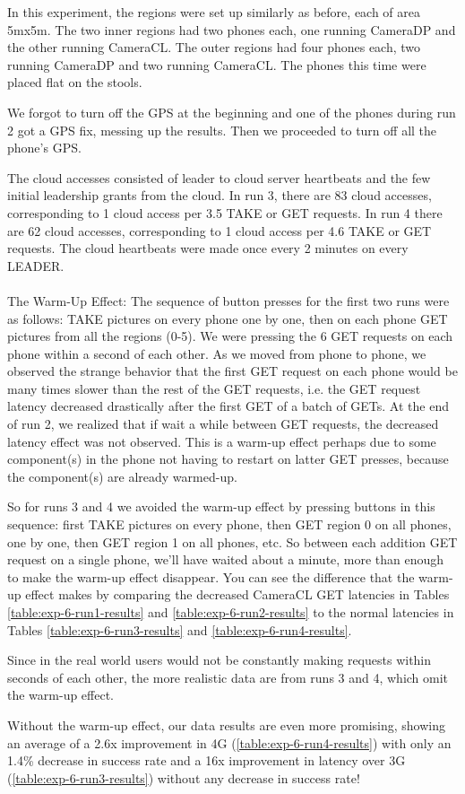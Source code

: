 In this experiment, the regions were set up similarly as before, each of area 5mx5m. The two inner regions had two phones each, one running CameraDP and the other running CameraCL. The outer regions had four phones each, two running CameraDP and two running CameraCL. The phones this time were placed flat on the stools.

We forgot to turn off the GPS at the beginning and one of the phones during run 2 got a GPS fix, messing up the results. Then we proceeded to turn off all the phone's GPS. 

The cloud accesses consisted of leader to cloud server heartbeats and the few initial leadership grants from the cloud. In run 3, there are 83 cloud accesses, corresponding to 1 cloud access per 3.5 TAKE or GET requests. In run 4 there are 62 cloud accesses, corresponding to 1 cloud access per 4.6 TAKE or GET requests. The cloud heartbeats were made once every 2 minutes on every LEADER.
\\
\\
The Warm-Up Effect:
The sequence of button presses for the first two runs were as follows: TAKE pictures on every phone one by one, then on each phone GET pictures from all the regions (0-5). We were pressing the 6 GET requests on each phone within a second of each other. As we moved from phone to phone, we observed the strange behavior that the first GET request on each phone would be many times slower than the rest of the GET requests, i.e. the GET request latency decreased drastically after the first GET of a batch of GETs. At the end of run 2, we realized that if wait a while between GET requests, the decreased latency effect was not observed.  This is a warm-up effect perhaps due to some component(s) in the phone not having to restart on latter GET presses, because the component(s) are already warmed-up.

So for runs 3 and 4 we avoided the warm-up effect by pressing buttons in this sequence: first TAKE pictures on every phone, then GET region 0 on all phones, one by one, then GET region 1 on all phones, etc. So between each addition GET request on a single phone, we'll have waited about a minute, more than enough to make the warm-up effect disappear.  You can see the difference that the warm-up effect makes by comparing the decreased CameraCL GET latencies in Tables \ref{table:exp-6-run1-results} and \ref{table:exp-6-run2-results} to the normal latencies in Tables \ref{table:exp-6-run3-results} and \ref{table:exp-6-run4-results}. 

Since in the real world users would not be constantly making requests within seconds of each other, the more realistic data are from runs 3 and 4, which omit the warm-up effect.

Without the warm-up effect, our data results are even more promising, showing an average of a 2.6x improvement in 4G (\ref{table:exp-6-run4-results}) with only an 1.4\% decrease in success rate and a 16x improvement in latency over 3G (\ref{table:exp-6-run3-results}) without any decrease in success rate!